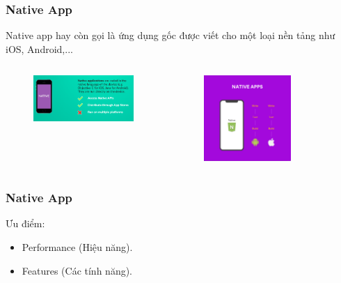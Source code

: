 \documentclass{beamer}
\begin{document}
\begin{frame}
\label{NATIVE_APP}
\frametitle{Native App}

Native app hay còn gọi là ứng dụng gốc được viết cho một loại nền tảng như iOS, Android,...

\begin{columns}

\begin{figure}[h]
	\vspace{5pt}
	\centering
	\includegraphics[width=.9\textwidth]{native-app-1}
\end{figure}


\begin{figure}[h]
	\vspace{5pt}
	\centering
	\includegraphics[width=0.7\textwidth]{native-app-2}
\end{figure}

\end{columns}

\end{frame}


\begin{frame}
\frametitle{Native App}

Ưu điểm:
\begin{itemize}
    \item<1-> Performance (Hiệu năng).
    \item<2-> Features (Các tính năng).
\end{itemize}

\end{frame}
\end{document}
